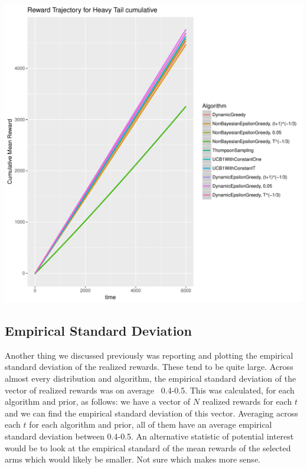 \documentclass[11pt,letterpaper]{article}
\begin{document}
\includegraphics[scale=0.5]{"../results/Reward Trajectory for Heavy Tail cumulative"} \\

\subsection*{Empirical Standard Deviation}

Another thing we discussed previously was reporting and plotting the empirical standard deviation of the realized rewards. These tend to be quite large. Across almost every distribution and algorithm, the empirical standard deviation of the vector of realized rewards was on average ~0.4-0.5. This was calculated, for each algorithm and prior, as follows: we have a vector of $N$ realized rewards for each $t$ and we can find the empirical standard deviation of this vector. Averaging across each $t$ for each algorithm and prior, all of them have an average empirical standard deviation between 0.4-0.5. An alternative statistic of potential interest would be to look at the empirical standard of the mean rewards of the selected arms which would likely be smaller. Not sure which makes more sense.
\end{document}
